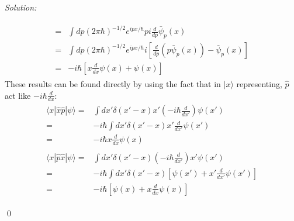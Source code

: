 \documentclass[12pt,a4paper]{article}
\newenvironment{sol}
    {\emph{Solution:}
    }
    {
    \qed
    }
\begin{document}
\begin{sol}
\begin{gather}
\begin{align}
\nonumber=&\int dp(2\pi\hbar)^{-1/2}e^{ipx/\hbar}pi\frac{d}{dp}\bar{\psi}_p(x)\\
\nonumber=&\int dp(2\pi\hbar)^{-1/2}e^{ipx/\hbar}i[\frac{d}{dp}(p\bar{\psi}_p(x))-\bar{\psi}_p(x)]\\
=&-i\hbar[x\frac{d}{dx}\psi(x)+\psi(x)]
\end{align}
\end{gather}
These results can be found directly by using the fact that in $|x\rangle$ representing, $\hat{p}$ act like $-i\hbar\frac{d}{dx}$:
\begin{gather}
\begin{align}
\nonumber\langle x|\hat{x}\hat{p}|\psi\rangle=&\int dx'\delta(x'-x)x'(-i\hbar\frac{d}{dx'})\psi(x')\\
\nonumber=&-i\hbar\int dx'\delta(x'-x)x'\frac{d}{dx'}\psi(x')\\
=&-i\hbar x\frac{d}{dx}\psi(x)
\end{align}\\
\begin{align}
\nonumber\langle x|\hat{p}\hat{x}|\psi\rangle=&\int dx'\delta(x'-x)(-i\hbar\frac{d}{dx'})x'\psi(x')\\
\nonumber=&-i\hbar\int dx'\delta(x'-x)[\psi(x')+x'\frac{d}{dx'}\psi(x')]\\
=&-i\hbar[\psi(x)+x\frac{d}{dx}\psi(x)]
\end{align}
\end{gather}
\end{sol}
\end{document}
